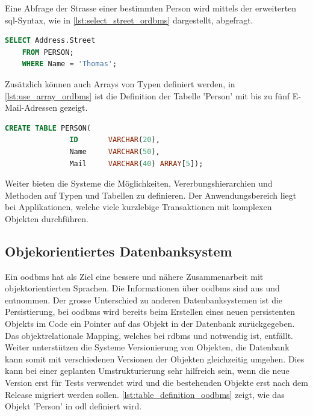 Eine Abfrage der Strasse einer bestimmten Person wird mittels der erweiterten \gls{sql}-Syntax, wie in \autoref{lst:select_street_ordbms} dargestellt, abgefragt.

\begin{lstlisting}[language=SQL, caption=Abfrage in objektrelationalem Datenbanksystem, label=lst:select_street_ordbms]  
    SELECT Address.Street
    FROM PERSON;
    WHERE Name = 'Thomas';
\end{lstlisting}

Zusätzlich können auch Arrays von Typen definiert werden, in \autoref{lst:use_array_ordbms} ist die Definition der Tabelle 'Person' mit 
bis zu fünf E-Mail-Adressen gezeigt.

\begin{lstlisting}[language=SQL, caption=Verwendung von Array in objektrelationalem Datenbanksystem, label=lst:use_array_ordbms]  
    CREATE TABLE PERSON(
               ID       VARCHAR(20),
               Name     VARCHAR(50),
               Mail     VARCHAR(40) ARRAY[5]);
\end{lstlisting}

Weiter bieten die Systeme die Möglichkeiten, Vererbungshierarchien und Methoden auf Typen und Tabellen zu definieren. Der Anwendungsbereich 
liegt bei Applikationen, welche viele kurzlebige Transaktionen mit komplexen Objekten durchführen.

\subsection{Objekorientiertes Datenbanksystem}\label{object_db}
Ein \gls{oodbms} hat als Ziel eine bessere und nähere Zusammenarbeit mit objektorientierten Sprachen. 
Die Informationen über \gls{oodbms} sind aus \cite{limited2010introduction} und \cite{oodbms_details} entnommen. Der grosse Unterschied zu anderen Datenbanksystemen
ist die Persistierung, bei \gls{oodbms} wird bereits beim Erstellen eines neuen persistenten Objekts im Code ein Pointer auf das Objekt in der Datenbank zurückgegeben. 
Das objektrelationale Mapping, welches bei \gls{rdbms} und  notwendig ist, entfällt. 
Weiter unterstützen die Systeme Versionierung von Objekten, die Datenbank kann somit mit verschiedenen Versionen der Objekten gleichzeitig umgehen. 
Dies kann bei einer geplanten Umstrukturierung sehr hilfreich sein, wenn die neue Version erst für Tests verwendet wird und die bestehenden Objekte erst nach dem 
Release migriert werden sollen. \autoref{lst:table_definition_oodbms} zeigt, wie das Objekt 'Person' in \gls{odl} definiert wird.

